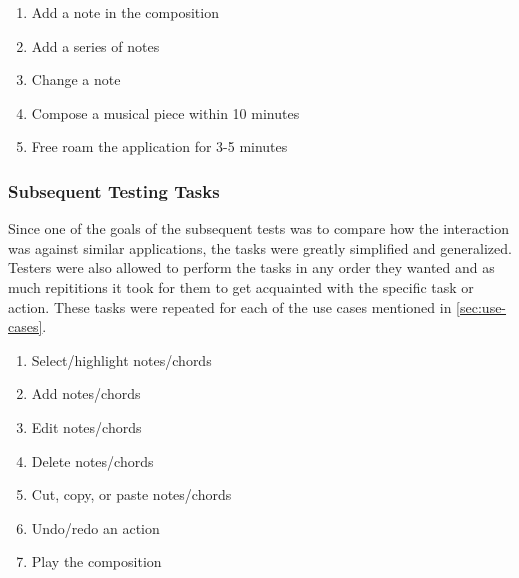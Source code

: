 \begin{enumerate}
\item Add a note in the composition
\item Add a series of notes
\item Change a note
\item Compose a musical piece within 10 minutes
\item Free roam the application for 3-5 minutes
\end{enumerate}

\subsubsection{Subsequent Testing Tasks}
\label{sec:subsequent-tasks}

Since one of the goals of the subsequent tests was to compare how the interaction was against similar applications, the tasks were greatly simplified and generalized. Testers were also allowed to perform the tasks in any order they wanted and as much repititions it took for them to get acquainted with the specific task or action. These tasks were repeated for each of the use cases mentioned in \ref{sec:use-cases}.

\begin{enumerate}
  \item Select/highlight notes/chords
  \item Add notes/chords
  \item Edit notes/chords
  \item Delete notes/chords
  \item Cut, copy, or paste notes/chords
  \item Undo/redo an action
  \item Play the composition
\end{enumerate}


